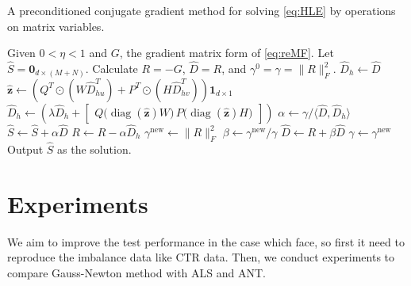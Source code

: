 \documentclass[11pt,twoside]{article}
\newcommand{\bsym}[1]{\ensuremath{\boldsymbol{#1}}}
\newcommand{\bz}{\ensuremath{\bsym{z}}}
\DeclareMathOperator*{\diag}{diag}
\begin{document}
\begin{algorithm}[t]
    \caption{A preconditioned conjugate gradient method for solving \eqref{eq:HLE} by operations on matrix variables.}
    \label{alg:Pcg}
    \begin{algorithmic}[1]
        \State Given $0<\eta<1$ and $G$, the gradient matrix form of \eqref{eq:reMF}. Let $\hat{S}=\bsym{0}_{d\times (M+N)}$.
        \State Calculate $R = -G$, $\hat{D}=R$, and $\gamma^0=\gamma=\|R\|_F^2$.
            \State $\hat{D}_h \gets \hat{D} $
            \State $\hat{\bz}\gets \left( {Q^T}\odot{(W\hat{D}_{hu}^T)}+{P^T}\odot{(H\hat{D}_{hv}^T)} \right) \bsym{1}_{d\times 1}$
            \State $\hat{D}_h \gets \left(\lambda \hat{D}_h + \begin{bmatrix} Q \bigl(\diag(\hat{\bz}) W \bigr) \, P \bigl ( \diag(\hat{\bz}) H \bigr) \end{bmatrix}\right) $
            \State $\alpha \gets \gamma / \langle \hat{D},\hat{D}_h \rangle$
            \State $\hat{S} \gets\hat{S}+\alpha \hat{D}$
            \State $R \gets R-\alpha \hat{D}_h$
            \State $\gamma^{\text{new}} \gets \|R\|_F^2$
            \State $\beta \gets \gamma^{\text{new}}/\gamma$
            \State $\hat{D} \gets R+\beta \hat{D}$
            \State $\gamma \gets \gamma^{\text{new}}$
        \EndWhile
        \State Output $\hat{S}$ as the solution.
    \end{algorithmic}
\end{algorithm}

\section{Experiments}
We aim to improve the test performance in the case which \cite{test17a} face, so first it need to reproduce the imbalance data like CTR data. Then, we conduct experiments to compare Gauss-Newton method with ALS and ANT.  
\end{document}
